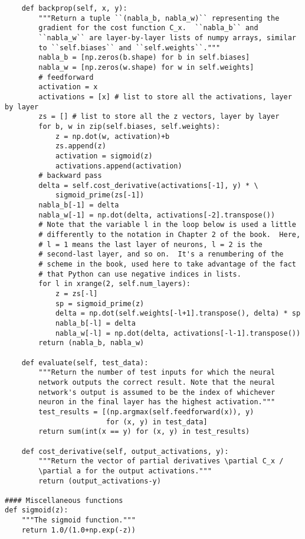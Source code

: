 \documentclass[11pt,a4j,fleqn]{jarticle}
\begin{document}
\begin{verbatim}
    def backprop(self, x, y):
        """Return a tuple ``(nabla_b, nabla_w)`` representing the
        gradient for the cost function C_x.  ``nabla_b`` and
        ``nabla_w`` are layer-by-layer lists of numpy arrays, similar
        to ``self.biases`` and ``self.weights``."""
        nabla_b = [np.zeros(b.shape) for b in self.biases]
        nabla_w = [np.zeros(w.shape) for w in self.weights]
        # feedforward
        activation = x
        activations = [x] # list to store all the activations, layer by layer
        zs = [] # list to store all the z vectors, layer by layer
        for b, w in zip(self.biases, self.weights):
            z = np.dot(w, activation)+b
            zs.append(z)
            activation = sigmoid(z)
            activations.append(activation)
        # backward pass
        delta = self.cost_derivative(activations[-1], y) * \
            sigmoid_prime(zs[-1])
        nabla_b[-1] = delta
        nabla_w[-1] = np.dot(delta, activations[-2].transpose())
        # Note that the variable l in the loop below is used a little
        # differently to the notation in Chapter 2 of the book.  Here,
        # l = 1 means the last layer of neurons, l = 2 is the
        # second-last layer, and so on.  It's a renumbering of the
        # scheme in the book, used here to take advantage of the fact
        # that Python can use negative indices in lists.
        for l in xrange(2, self.num_layers):
            z = zs[-l]
            sp = sigmoid_prime(z)
            delta = np.dot(self.weights[-l+1].transpose(), delta) * sp
            nabla_b[-l] = delta
            nabla_w[-l] = np.dot(delta, activations[-l-1].transpose())
        return (nabla_b, nabla_w)

    def evaluate(self, test_data):
        """Return the number of test inputs for which the neural
        network outputs the correct result. Note that the neural
        network's output is assumed to be the index of whichever
        neuron in the final layer has the highest activation."""
        test_results = [(np.argmax(self.feedforward(x)), y)
                        for (x, y) in test_data]
        return sum(int(x == y) for (x, y) in test_results)

    def cost_derivative(self, output_activations, y):
        """Return the vector of partial derivatives \partial C_x /
        \partial a for the output activations."""
        return (output_activations-y)

#### Miscellaneous functions
def sigmoid(z):
    """The sigmoid function."""
    return 1.0/(1.0+np.exp(-z))


\end{verbatim}
\end{document}
